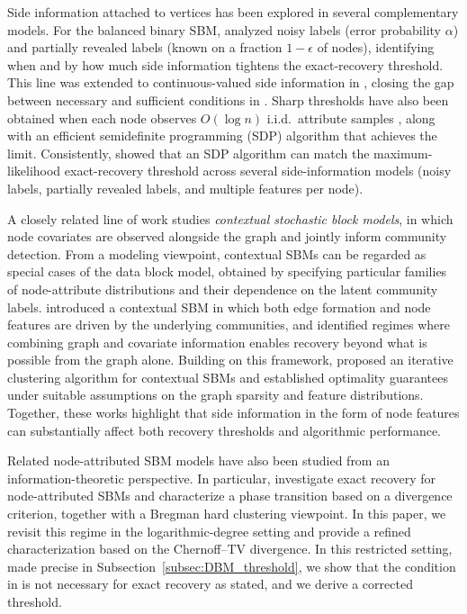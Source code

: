 \documentclass[11pt]{article}
\theoremstyle{plain}
\theoremstyle{definition}
\begin{document}
Side information attached to vertices has been explored in several complementary models. For the balanced binary SBM, \citet{SN18} analyzed noisy labels (error probability $\alpha$) and partially revealed labels (known on a fraction $1-\epsilon$ of nodes), identifying when and by how much side information tightens the exact-recovery threshold. This line was extended to continuous-valued side information in \citet{SN19}, closing the gap between necessary and sufficient conditions in \citet{SN18}. Sharp thresholds have also been obtained when each node observes $O(\log n)$ i.i.d.\ attribute samples \citep{SZH21}, along with an efficient semidefinite programming (SDP) algorithm that achieves the limit. Consistently, \citet{ESN21} showed that an SDP algorithm can match the maximum-likelihood exact-recovery threshold across several side-information models (noisy labels, partially revealed labels, and multiple features per node).


A closely related line of work studies \emph{contextual stochastic block models}, in which node covariates are observed alongside the graph and jointly inform community detection. From a modeling viewpoint, contextual SBMs can be regarded as special cases of the data block model, obtained by specifying particular families of node-attribute distributions and their dependence on the latent community labels. \cite{deshpande2018contextual} introduced a contextual SBM in which both edge formation and node features are driven by the underlying communities, and identified regimes where combining graph and covariate information enables recovery beyond what is possible from the graph alone. Building on this framework, \cite{braun2022iterative} proposed an iterative clustering algorithm for contextual SBMs and established optimality guarantees under suitable assumptions on the graph sparsity and feature distributions. Together, these works highlight that side information in the form of node features can substantially affect both recovery thresholds and algorithmic performance.

Related node-attributed SBM models have also been studied from an information-theoretic perspective. In particular, \citet{dreveton2023exactAttributedSBM} investigate exact recovery for node-attributed SBMs and characterize a phase transition based on a divergence criterion, together with a Bregman hard clustering viewpoint. In this paper, we revisit this regime in the logarithmic-degree setting and provide a refined characterization based on the Chernoff--TV divergence. In this restricted setting, made precise in Subsection~\ref{subsec:DBM_threshold}, we show that the condition in \citep{dreveton2023exactAttributedSBM} is not necessary for exact recovery as stated, and we derive a corrected threshold.
\end{document}
